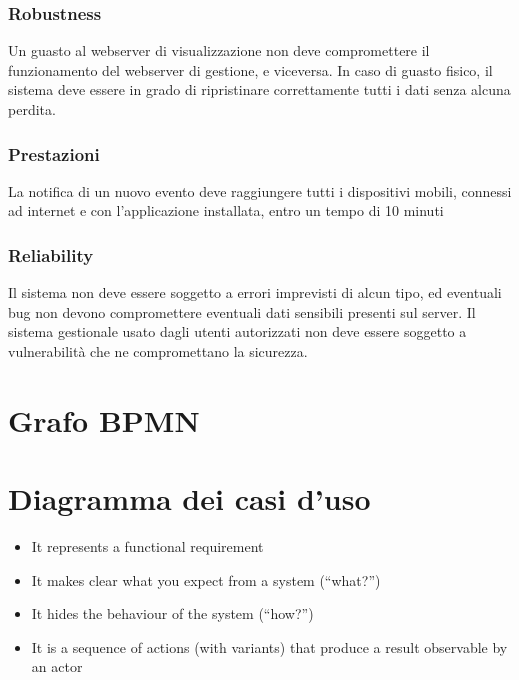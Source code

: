 \documentclass{article}
\begin{document}
\subsubsection{Robustness}
Un guasto al webserver di visualizzazione non deve compromettere il funzionamento del webserver di gestione, e viceversa.
In caso di guasto fisico, il sistema deve essere in grado di ripristinare correttamente tutti i dati senza alcuna perdita. 

\subsubsection{Prestazioni}
La notifica di un nuovo evento deve raggiungere tutti i dispositivi mobili, connessi ad internet e con l'applicazione installata, entro un tempo di 10 minuti

\subsubsection{Reliability}
Il sistema non deve essere soggetto a errori imprevisti di alcun tipo, ed eventuali bug non devono compromettere eventuali dati sensibili presenti sul server.
Il sistema gestionale usato dagli utenti autorizzati non deve essere soggetto a vulnerabilità che ne compromettano la sicurezza. 

\clearpage

\section{Grafo BPMN}
\clearpage

\section{Diagramma dei casi d'uso}

\begin{itemize}
    \item It represents a functional requirement
    \item It makes clear what you expect from a system (“what?”)
    \item It hides the behaviour of the system (“how?”)
    \item It is a sequence of actions (with variants) that produce a result observable by an actor
\end{itemize}
\end{document}
